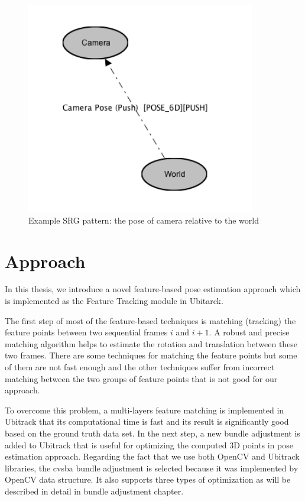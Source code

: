 \begin{figure}[H]
  \centering
  \includegraphics[width=100mm]{figures/ubitrack}
  \caption{Example SRG pattern: the pose of camera relative to the world} \label{fig:ubitrack}
\end{figure}

\section {Approach} \label{sec:approach}
In this thesis, we introduce a novel feature-based pose estimation approach which is implemented as the Feature Tracking module in Ubitarck. 

The first step of most of the feature-based techniques is matching (tracking) the feature points between two sequential frames $i$ and $i+1$. A robust and precise matching algorithm helps to estimate the rotation and translation between these two frames. There are some techniques for matching the feature points but some of them are not fast enough and the other techniques suffer from incorrect matching between the two groups of feature points that is not good for our approach. 

To overcome this problem, a multi-layers feature matching is implemented in Ubitrack that its computational time is fast and its result is significantly good based on the ground truth data set. In the next step, a new bundle adjustment is added to Ubitrack that is useful for optimizing the computed 3D points in pose estimation approach. Regarding the fact that we use both OpenCV and Ubitrack libraries, the cvsba bundle adjustment is selected because it was implemented by OpenCV data structure. It also supports three types of optimization as will be  described in detail in bundle adjustment chapter.

